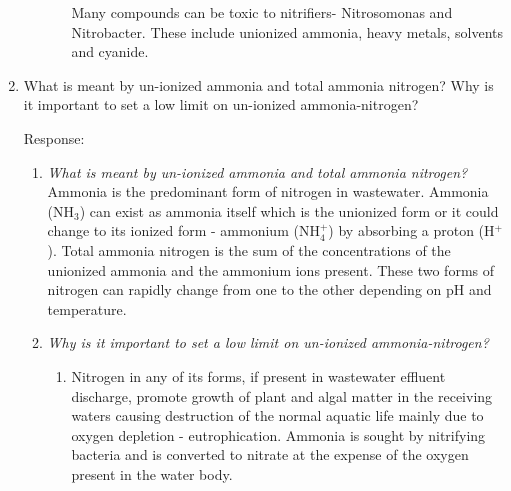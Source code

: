\begin{enumerate}
\begin{enumerate}[label=\alph*]
\begin{enumerate}
\noindent Many compounds can be toxic to nitrifiers- Nitrosomonas and Nitrobacter.  These include unionized ammonia, heavy metals, solvents and cyanide.  
\end{enumerate}
\end{enumerate}

\newpage
\item What is meant by un-ionized ammonia and total ammonia nitrogen?  Why is it important to set a low limit on un-ionized ammonia-nitrogen?



Response:\\
\begin{enumerate}[label=\alph*]
\item \textit{What is meant by un-ionized ammonia and total ammonia nitrogen?}\\
Ammonia is the predominant form of nitrogen in wastewater.  Ammonia (NH$_3$) can exist as ammonia itself which is the unionized form or it could change to its ionized form - ammonium (NH$_4^+$) by absorbing a proton (H$^+$).   Total ammonia nitrogen is the sum of the concentrations of the unionized ammonia and the ammonium ions present.  These two forms of nitrogen can rapidly change from one to the other depending on pH and temperature.
\item \textit{Why is it important to set a low limit on un-ionized ammonia-nitrogen?}\\
\begin{enumerate}
\item Nitrogen in any of its forms, if present in wastewater effluent discharge, promote growth of plant and algal matter in the receiving waters causing destruction of the normal aquatic life mainly due to oxygen depletion - eutrophication.  Ammonia is sought by nitrifying bacteria and is converted to nitrate at the expense of the oxygen present in the water body.\\


\end{enumerate}
\end{enumerate}
\end{enumerate}
